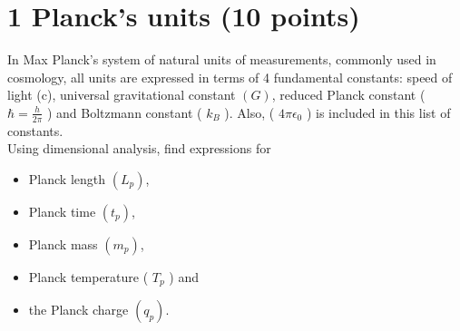 \documentclass[10pt]{article}
\begin{document}
\section*{1 Planck's units (10 points)}
In Max Planck's system of natural units of measurements, commonly used in cosmology, all units are expressed in terms of 4 fundamental constants: speed of light (c), universal gravitational constant $(G)$, reduced Planck constant ( $\hbar=\frac{h}{2 \pi}$ ) and Boltzmann constant ( $k_{B}$ ). Also, ( $4 \pi \epsilon_{0}$ ) is included in this list of constants.\\
Using dimensional analysis, find expressions for

\begin{itemize}
  \item Planck length $\left(L_{p}\right)$,
  \item Planck time $\left(t_{p}\right)$,
  \item Planck mass $\left(m_{p}\right)$,
  \item Planck temperature ( $T_{p}$ ) and
  \item the Planck charge $\left(q_{p}\right)$.
\end{itemize}
\end{document}
